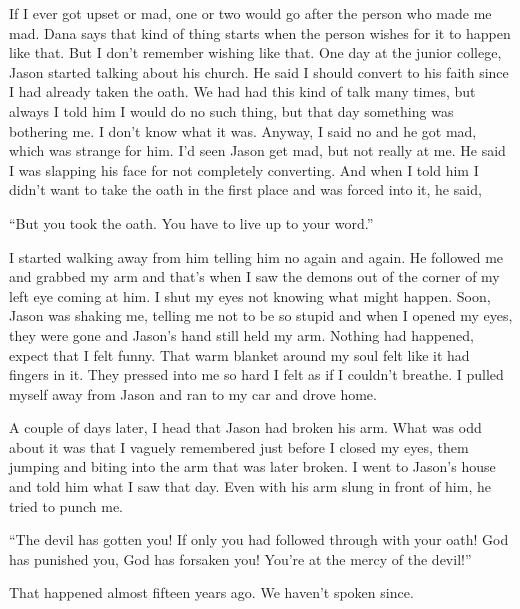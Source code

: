 If I ever got upset or mad, one or two would go after the person who
made me mad. Dana says that kind of thing starts when the person wishes
for it to happen like that. But I don't remember wishing like that. One
day at the junior college, Jason started talking about his church. He
said I should convert to his faith since I had already taken the oath.
We had had this kind of talk many times, but always I told him I would
do no such thing, but that day something was bothering me. I don't know
what it was. Anyway, I said no and he got mad, which was strange for
him. I'd seen Jason get mad, but not really at me. He said I was
slapping his face for not completely converting. And when I told him I
didn't want to take the oath in the first place and was forced into it,
he said,

``But you took the oath. You have to live up to your word.''

I started walking away from him telling him no again and again. He
followed me and grabbed my arm and that's when I saw the demons out of
the corner of my left eye coming at him. I shut my eyes not knowing what
might happen. Soon, Jason was shaking me, telling me not to be so stupid
and when I opened my eyes, they were gone and Jason's hand still held my
arm. Nothing had happened, expect that I felt funny. That warm blanket
around my soul felt like it had fingers in it. They pressed into me so
hard I felt as if I couldn't breathe. I pulled myself away from Jason
and ran to my car and drove home.

A couple of days later, I head that Jason had broken his arm. What was
odd about it was that I vaguely remembered just before I closed my eyes,
them jumping and biting into the arm that was later broken. I went to
Jason's house and told him what I saw that day. Even with his arm slung
in front of him, he tried to punch me.

``The devil has gotten you! If only you had followed through with your
oath! God has punished you, God has forsaken you! You're at the mercy of
the devil!''

That happened almost fifteen years ago. We haven't spoken since.

